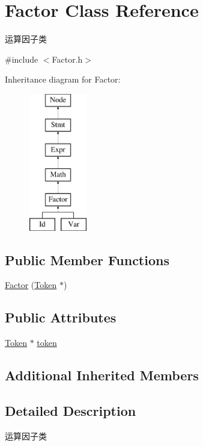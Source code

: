 \hypertarget{class_factor}{}\section{Factor Class Reference}
\label{class_factor}


运算因子类  




{\ttfamily \#include $<$Factor.\+h$>$}

Inheritance diagram for Factor\+:\begin{figure}[H]
\begin{center}
\leavevmode
\includegraphics[height=6.000000cm]{class_factor}
\end{center}
\end{figure}
\subsection*{Public Member Functions}
\begin{DoxyCompactItemize}
\item 
\hyperlink{class_factor_af17f55c01064dcb353c47243931d095a}{Factor} (\hyperlink{class_token}{Token} $\ast$)
\end{DoxyCompactItemize}
\subsection*{Public Attributes}
\begin{DoxyCompactItemize}
\item 
\hyperlink{class_token}{Token} $\ast$ \hyperlink{class_factor_ab2c56fe952c0e3dad6006950e166495b}{token}
\end{DoxyCompactItemize}
\subsection*{Additional Inherited Members}


\subsection{Detailed Description}
运算因子类 

